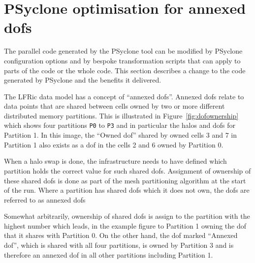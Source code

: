 \section{PSyclone optimisation for annexed dofs}

The parallel code generated by the PSyclone tool can be modified by
PSyclone configuration options and by bespoke transformation scripts
that can apply to parts of the code or the whole code. This section
describes a change to the code generated by PSyclone and the benefits
it delivered.

The LFRic data model has a concept of ``annexed dofs''. Annexed dofs
relate to data points that are shared between cells owned by two or
more different distributed memory partitions. This is illustrated in
Figure~\ref{fig:dofownership} which shows four partitions {\tt P0} to
{\tt P3} and in particular the halos and dofs for Partition 1. In this
image, the ``Owned dof'' shared by owned cells 3 and 7 in Partition 1
also exists as a dof in the cells 2 and 6 owned by Partition 0.

When a halo swap is done, the infrastructure needs to have defined
which partition holds the correct value for such shared
dofs. Assignment of ownership of these shared dofs is done as part of
the mesh partitioning algorithm at the start of the run. Where a
partition has shared dofs which it does not own, the dofs are referred
to as annexed dofs

Somewhat arbitrarily, ownership of shared dofs is assign to the
partition with the highest number which leads, in the example figure
to Partition 1 owning the dof that it shares with Partition 0. On the
other hand, the dof marked ``Annexed dof'', which is shared with all
four partitions, is owned by Partition 3 and is therefore an annexed
dof in all other partitions including Partition 1.

